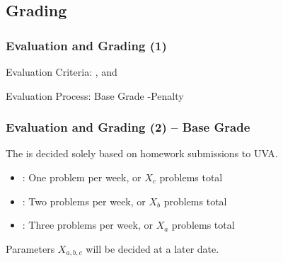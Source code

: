 \documentclass{beamer}
\begin{document}
\subsection{Grading}

\begin{frame}
  \frametitle{Evaluation and Grading (1)}

  Evaluation Criteria: , 
  and 
  
  \bigskip

  Evaluation Process: Base Grade  \alert{-Penalty}
\end{frame}

\begin{frame}
  \frametitle{Evaluation and Grading (2) -- Base Grade}

  The  is decided solely based on homework
  submissions to UVA.

  \bigskip
  
  \begin{itemize}
  \item {}: One problem per week, or $X_c$ problems total

    \medskip

  \item {}: Two problems per week, or $X_b$ problems total

    \medskip

  \item {}: Three problems per week, or $X_a$ problems total
  \end{itemize}

  \bigskip
  
  Parameters $X_{a,b,c}$ will be decided at a later date.

\end{frame}
\end{document}
